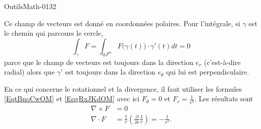 
\begin{corrige}{OutilsMath-0132}

    Ce champ de vecteurs est donné en coordonnées polaires. Pour l'intégrale, si \( \gamma\) est le chemin qui parcours le cercle,
    \begin{equation}
        \int_{\gamma}F=\int_{0J^{2\pi}}F\big( \gamma(t) \big)\cdot \gamma'(t)dt=0
    \end{equation}
    parce que le champ de vecteurs est toujours dans la direction \( e_r\) (c'est-à-dire radial) alors que \( \gamma'\) est toujours dans la direction \( e_{\theta}\) qui lui est perpendiculaire.

    En ce qui concerne le rotationnel et la divergence, il faut utiliser les formules \eqref{EqtBnoCwOM} et \eqref{EqgRxJKdOM} avec ici \( F_{\theta}=0\) et \( F_r=\frac{1}{ r^2 }\). Les résultats sont
    \begin{subequations}
        \begin{align}
            \nabla\times F&=0\\
            \nabla\cdot F&=\frac{1}{ r }\left( \frac{ \partial  }{ \partial r }\frac{1}{ r } \right)=-\frac{1}{ r^3 }.
        \end{align}
    \end{subequations}

\end{corrige}
